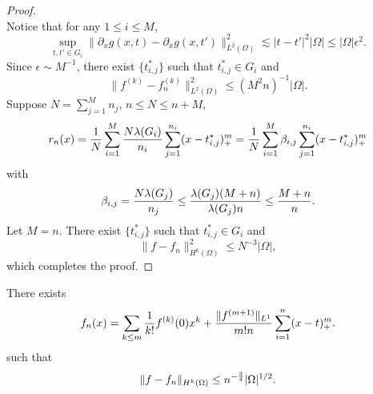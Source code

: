 \begin{proof}
\begin{equation}
\end{equation}
Notice that for any $1\le i\le M$,
\begin{equation}
\sup_{t,t'\in G_i} \| \partial_x g(x,t) - \partial_x g(x,t')\|^2_{L^2(\Omega)}\lesssim |t-t'|^2|\Omega| \le | \Omega| \epsilon^2.
\end{equation}
Since $\epsilon \sim M^{-1}$,
there exist $\{t_{i,j}^\ast\}$ such that $t_{i,j}^\ast\in G_i$ and 
\begin{equation}
\| f^{(k)} -  f_n^{(k)} \|_{L^2(\Omega)}^2\leq (M^2n)^{-1}| \Omega|.
\end{equation}
Suppose $\displaystyle N=\sum_{j=1}^M n_j$, $n\le N\le n+M$,
$$
r_n(x) =  {1\over N}\sum_{i=1}^{M}\frac{N\lambda(G_i)}{n_i}\sum_{j=1}^{n_i} (x - t_{i,j}^\ast)_+^m
 =  {1\over N}\sum_{i=1}^{M}\beta_{i,j}\sum_{j=1}^{n_i} (x - t_{i,j}^\ast)_+^m
$$ 
with
\begin{equation}
\beta_{i,j}= \frac{N\lambda(G_j)}{n_j}\le \frac{\lambda(G_j)(M+n)}{\lambda(G_j)n}\le {M+n\over n}.
\end{equation}
Let $M=n$. There exist $\{t_{i,j}^\ast\}$ such that $t_{i,j}^\ast\in G_i$ and 
\begin{equation}
\| f -  f_n \|_{H^k(\Omega)}^2\leq N^{-3}| \Omega|,
\end{equation}
which completes the proof. 
\end{proof}

\begin{theorem} 
	 There exists 
	 \begin{equation}
\begin{aligned}
f_n(x) = \sum_{k\le m}{1\over k!}f^{(k)}(0) x^k + { \|f^{(m+1)}\|_{L^1}\over m!n}\sum_{i=1}^n (x-t)_+^m.
\end{aligned}
\end{equation}
 such that
	\begin{equation} 
	\|f-f_n\|_{H^k(\Omega)} \leq n^{-{3\over 4}}|\Omega|^{1/2}.
	\end{equation}  
\end{theorem} 

